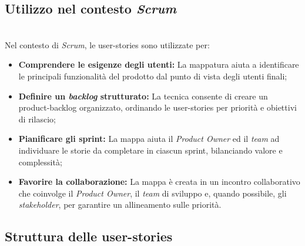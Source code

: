 \subsection*{Utilizzo nel contesto \textit{Scrum}}\\

\noindent Nel contesto di \textit{Scrum}, le \gls{user-stories} sono utilizzate per:

\begin{itemize}
    \item \textbf{Comprendere le esigenze degli utenti:} La mappatura aiuta a identificare le principali funzionalità del prodotto dal punto di vista degli utenti finali;
    \item \textbf{Definire un \textit{backlog} strutturato:} La tecnica consente di creare un \gls{product-backlog} organizzato, ordinando le \gls{user-stories} per priorità e obiettivi di rilascio;
    \item \textbf{Pianificare gli \gls{sprint}:} La mappa aiuta il \textit{Product Owner} ed il \textit{team} ad individuare le storie da completare in ciascun \gls{sprint}, bilanciando valore e complessità;
    \item \textbf{Favorire la collaborazione:} La mappa è creata in un incontro collaborativo che coinvolge il \textit{Product Owner}, il \textit{team} di sviluppo e, quando possibile, gli \textit{stakeholder}, per garantire un allineamento sulle priorità.
\end{itemize}

\pagebreak
\subsection*{Struttura delle \gls{user-stories}}\\

